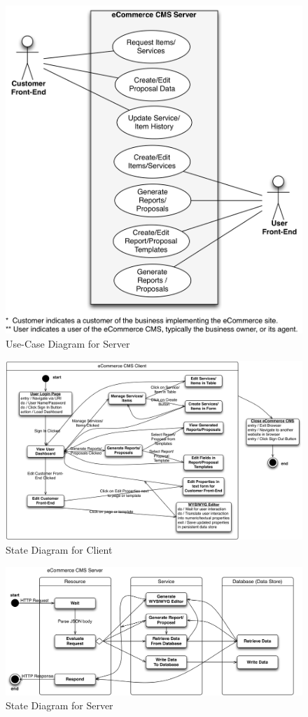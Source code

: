 \documentclass{article}
\begin{document}
\begin{figure}[H]
\centering
\includegraphics[width=4.5in]{../../UML/eccms-Use Case (Server) Diagram.png}
\caption{Use-Case Diagram for Server}
\label{server-usecase}
\end{figure}


\begin{figure}[H]
\centering
\includegraphics[width=6.5in]{../../UML/eccms-State (Client) Diagram.png}
\caption{State Diagram for Client}
\label{client-state}
\end{figure}

\begin{figure}[H]
\centering
\includegraphics[width=6.5in]{../../UML/eccms-State (Server) Diagram.png}
\caption{State Diagram for Server}
\label{server-state}
\end{figure}
\end{document}
